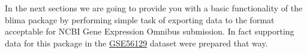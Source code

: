 In the next sections we are going to provide you with a basic functionality of the blima package by performing simple task of exporting data to the format acceptable for NCBI Gene Expression Omnibus submission. In fact supporting data for this package in the \href{http://www.ncbi.nlm.nih.gov/geo/query/acc.cgi?acc=GSE56129}{GSE56129} dataset were prepared that way.
